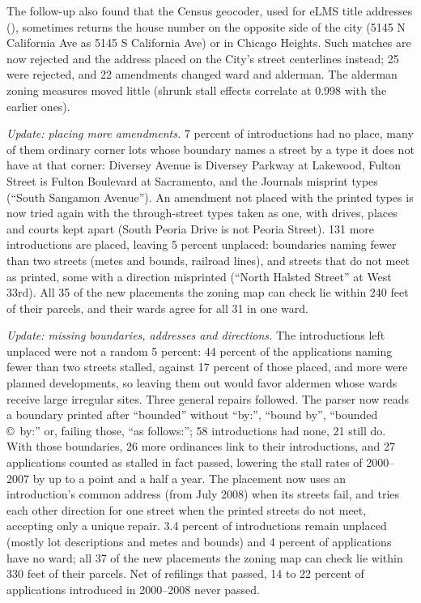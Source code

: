 The follow-up also found that the Census geocoder, used for eLMS title addresses
(), sometimes returns the house number on the opposite side of the city
(5145 N California Ave as 5145 S California Ave) or in Chicago Heights. Such matches are now rejected and the address
placed on the City's street centerlines instead; 25 were rejected, and 22 amendments changed ward and alderman. The
alderman zoning measures moved little (shrunk stall effects correlate at 0.998 with the earlier ones).

\textit{Update: placing more amendments.} 7 percent of introductions had no place, many of them ordinary corner
lots whose boundary names a street by a type it does not have at that corner: Diversey Avenue is Diversey Parkway at
Lakewood, Fulton Street is Fulton Boulevard at Sacramento, and the Journals misprint types (``South Sangamon Avenue'').
An amendment not placed with the printed types is now tried again with the through-street types taken as one, with
drives, places and courts kept apart (South Peoria Drive is not Peoria Street). 131 more introductions are placed,
leaving 5 percent unplaced: boundaries naming fewer than two streets (metes and bounds, railroad lines), and streets that do not meet as printed, some with a direction misprinted (``North Halsted Street'' at West 33rd). All 35 of the new placements the zoning map can check lie within 240 feet of their parcels, and their wards
agree for all 31 in one ward.

\textit{Update: missing boundaries, addresses and directions.} The introductions left unplaced were not a random
5 percent: 44 percent of the applications naming fewer than two streets stalled, against 17 percent of those placed,
and more were planned developments, so leaving them out would favor aldermen whose wards receive large irregular
sites. Three general repairs followed. The parser now reads a boundary printed after ``bounded'' without ``by:'', ``bound
by'', ``bounded \copyright\ by:'' or, failing those, ``as follows:''; 58 introductions had none, 21 still do. With those
boundaries, 26 more ordinances link to their introductions, and 27 applications counted as stalled in fact passed,
lowering the stall rates of 2000--2007 by up to a point and a half a year. The placement now uses an introduction's
common address (from July 2008) when its streets fail, and tries each other direction for one street when the
printed streets do not meet, accepting only a unique repair. 3.4 percent of introductions remain unplaced (mostly lot
descriptions and metes and bounds) and 4 percent of applications have no ward; all 37 of the new placements the
zoning map can check lie within 330 feet of their parcels. Net of refilings that passed, 14 to 22 percent of
applications introduced in 2000--2008 never passed.

